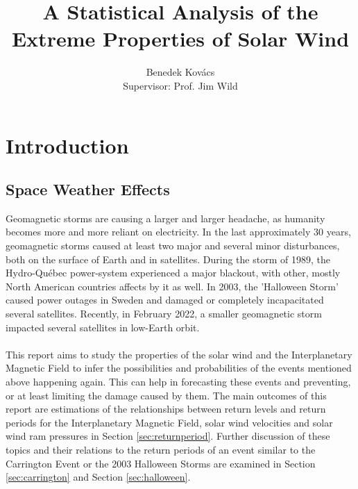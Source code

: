 \documentclass[11pt]{article}
\title{\vspace{-2em}A Statistical Analysis of the Extreme Properties of Solar Wind}
\author{Benedek Kovács\\ Supervisor: Prof. Jim Wild}
\date{}
\begin{document}
\maketitle
\begin{center}
\end{center}
\bigskip
\begin{abstract}
    
\end{abstract}
\newpage
\restoregeometry
\tableofcontents
\newpage
{}

\section{Introduction}\label{sec:introduction}
    \subsection{Space Weather Effects}\label{sec:spaceweather}
        Geomagnetic storms are causing a larger and larger headache, as humanity becomes more and more reliant on electricity. In the last approximately 30 years, geomagnetic storms caused at least two major and several minor disturbances, both on the surface of Earth and in satellites. During the storm of 1989, the Hydro-Québec power-system experienced a major blackout, with other, mostly North American countries affects by it as well\cite{1989hydroquebec}. In 2003, the 'Halloween Storm' \cite{2003halloweensweden} caused power outages in Sweden and damaged or completely incapacitated several satellites. Recently, in February 2022, a smaller geomagnetic storm impacted several satellites in low-Earth orbit\cite{2022spacex}.\\ \\
        This report aims to study the properties of the solar wind and the Interplanetary Magnetic Field to infer the possibilities and probabilities of the events mentioned above happening again. This can help in forecasting these events and preventing, or at least limiting the damage caused by them. The main outcomes of this report are estimations of the relationships between return levels and return periods for the Interplanetary Magnetic Field, solar wind velocities and solar wind ram pressures in Section \ref{sec:returnperiod}. Further discussion of these topics and their relations to the return periods of an event similar to the Carrington Event or the 2003 Halloween Storms are examined in Section \ref{sec:carrington} and Section \ref{sec:halloween}.
\end{document}
